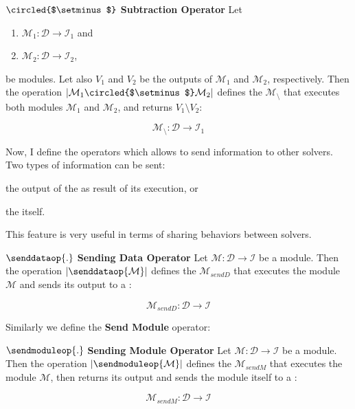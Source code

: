 \separation

\begin{definition}\label{op:subst}
$\circled{$\setminus$}$ {\bf Subtraction Operator} Let 
\begin{enumerate}%
	\item $\mathcal{M}_1 : \mathcal{D} \rightarrow \mathcal{I}_1$ and  
	\item $\mathcal{M}_2 : \mathcal{D} \rightarrow \mathcal{I}_2$,
\end{enumerate}%
be modules. %
Let also $V_1$ and $V_2$ be the outputs of $\mathcal{M}_1$ and $\mathcal{M}_2$, respectively. Then the operation $\left|\mathcal{M}_1\circled{$\setminus$}\mathcal{M}_2\right|$ defines the \cm{} $\mathcal{M}_{\setminus}$ that executes both modules $\mathcal{M}_1$ and $\mathcal{M}_2$, and returns $V_1 \setminus V_2$:

\[
\mathcal{M}_{\setminus}:\mathcal{D} \rightarrow \mathcal{I}_1
\]
\end{definition}

\separation

Now, I define the operators which allows to send information to other solvers. Two types of information can be sent: 
\begin{inparaenum}[i)]
	\item the output of the \om{} as result of its execution, or 
	\item the \om{} itself.
\end{inparaenum} This feature is very useful in terms of sharing behaviors between solvers.

\begin{definition}\label{op:osend}
$\senddataop{.}$ {\bf Sending Data Operator} Let $\mathcal{M} : \mathcal{D} \rightarrow \mathcal{I}$ be a module. Then the operation $\left|\senddataop{\mathcal{M}}\right|$ defines the \cm{} $\mathcal{M}_{sendD}$ that executes the module $\mathcal{M}$ and sends its output to a \opch:

\[
\mathcal{M}_{sendD}:\mathcal{D} \rightarrow \mathcal{I}
\]
\end{definition}

\separation

Similarly we define the \textbf{Send Module} operator:

\begin{definition}\label{op:msend}
$\sendmoduleop{.}$ {\bf Sending Module Operator} Let $\mathcal{M} : \mathcal{D} \rightarrow \mathcal{I}$ be a module. Then the operation $\left|\sendmoduleop{\mathcal{M}}\right|$ defines the \cm{} $\mathcal{M}_{sendM}$ that executes the module $\mathcal{M}$, then returns its output and sends the module itself to a \opch:

\[
\mathcal{M}_{sendM}:\mathcal{D} \rightarrow \mathcal{I}
\]
\end{definition}

